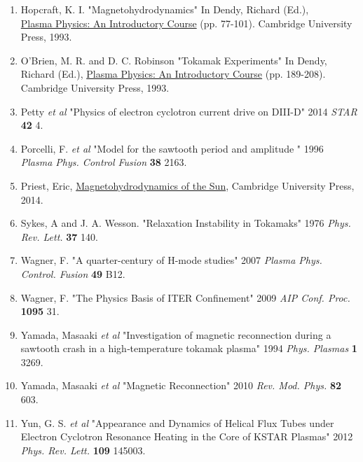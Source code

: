 \documentclass{article}
\begin{document}
\begin{enumerate}
\item Hopcraft, K. I. "Magnetohydrodynamics" In Dendy, Richard (Ed.),\\ \underline{Plasma Physics: An Introductory Course} (pp. 77-101). Cambridge University Press, 1993.
\item O'Brien, M. R. and D. C. Robinson "Tokamak Experiments" In Dendy, Richard (Ed.), \underline{Plasma Physics: An Introductory Course} (pp. 189-208). Cambridge University Press, 1993.
\item Petty \textit{et al} "Physics of electron cyclotron current drive on DIII-D" 2014 \textit{STAR} \textbf{42} 4.
\item Porcelli, F. \textit{et al} "Model for the sawtooth period and amplitude
" 1996 \textit{Plasma Phys. Control Fusion} \textbf{38} 2163.
\item Priest, Eric,  \underline{Magnetohydrodynamics of the Sun},  Cambridge University Press, 2014.
\item Sykes, A and J. A. Wesson.  "Relaxation Instability in Tokamaks" 1976 \textit{Phys. Rev. Lett.} \textbf{37} 140.
\item Wagner, F. "A quarter-century of H-mode studies" 2007 \textit{Plasma Phys. Control. Fusion} \textbf{49} B12.
\item Wagner, F. "The Physics Basis of ITER Confinement" 2009 \textit{AIP Conf. Proc.} \textbf{1095} 31.
\item Yamada, Masaaki \textit{et al} "Investigation of magnetic reconnection during a sawtooth crash in a high‐temperature tokamak plasma" 1994 \textit{Phys. Plasmas} \textbf{1} 3269.
\item Yamada, Masaaki \textit{et al} "Magnetic Reconnection" 2010 \textit{Rev. Mod. Phys.} \textbf{82} 603.
\item Yun, G. S. \textit{et al} "Appearance and Dynamics of Helical Flux Tubes under Electron Cyclotron Resonance Heating in the Core of KSTAR Plasmas" 2012 \textit{Phys. Rev. Lett.} \textbf{109} 145003.
\end{enumerate}
\end{document}

